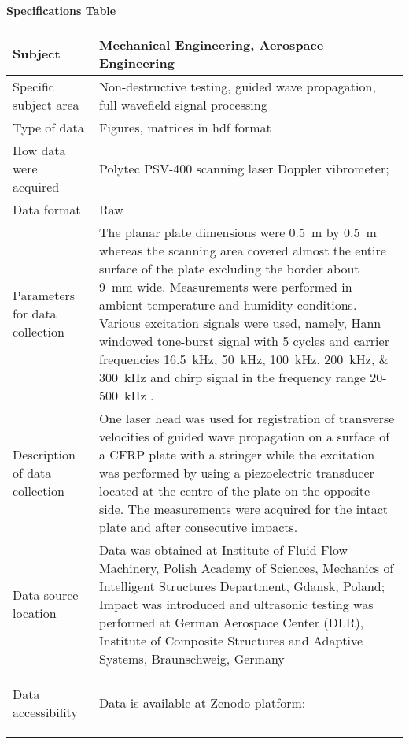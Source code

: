 \documentclass[times,final]{elsarticle}
\begin{document}
{\fontsize{7.5pt}{9pt}\selectfont
\noindent\textbf{Specifications Table} \\
 
\begin{longtable}{|p{33mm}|p{94mm}|}
\hline
\endhead
\hline
\endfoot
Subject                & {\color{red}Mechanical Engineering, Aerospace Engineering}\\
\hline                         
Specific subject area  & Non-destructive testing, guided wave propagation, full wavefield signal processing\\
\hline
Type of data           &  Figures, matrices in hdf format
                         \\             
How data were acquired & Polytec PSV-400 scanning laser Doppler vibrometer; \\
\hline                         
Data format            & Raw
                         \\
\hline                         
Parameters for data\newline 
collection             & The planar plate dimensions were \SI{0.5}{\meter} by \SI{0.5}{\meter} whereas the scanning area covered almost the entire surface of the plate excluding the border about \SI{9}{\milli\meter} wide. Measurements were performed in ambient temperature and humidity conditions. Various excitation signals were used, namely, Hann windowed tone-burst signal with \num{5} cycles and carrier frequencies \SIlist{16.5;50;100;200;300}{\kilo\hertz} and chirp signal in the frequency range \num{20}-\SI{500}{\kilo\hertz} .\\  

\hline
Description of          
data\newline 
collection             & One laser head was used for registration of transverse velocities of guided wave propagation on a surface of a CFRP plate with a stringer while the excitation was performed by using a piezoelectric transducer located at the centre of the plate on the opposite side. The measurements were acquired for the intact plate and after consecutive impacts. \\
\hline                         
Data source location   & Data was obtained at Institute of Fluid-Flow Machinery, Polish Academy of Sciences, Mechanics of Intelligent Structures Department, Gdansk, Poland; Impact was introduced and ultrasonic testing was performed at German Aerospace Center (DLR), Institute of Composite Structures and Adaptive Systems, Braunschweig, Germany
 \\
\hline                         
\hypertarget{target1}
{Data accessibility}   & Data is available at Zenodo platform:  
    

\end{longtable}}
\end{document}
